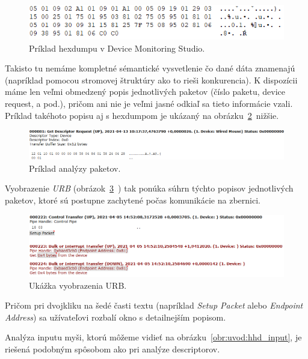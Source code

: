 \begin{figure}[!htb]
	\centering
	\includegraphics[width=12cm]{img/uvod_hhd_hexdump}
	\caption{Príklad hexdumpu v Device Monitoring Studio.}
	\label{obr:uvod:hhd_hexdump}
\end{figure}


Takisto tu nemáme kompletné sémantické vysvetlenie čo dané dáta znamenajú (napríklad pomocou stromovej štruktúry ako to rieši konkurencia). K dispozícii máme len veľmi obmedzený popis jednotlivých paketov (číslo paketu, device request, a pod.), pričom ani nie je veľmi jasné odkiaľ sa tieto informácie vzali. Príklad takéhoto popisu aj s hexdumpom je ukázaný na obrázku~\ref{obr:uvod:hhd_analyza}~nižšie.

\begin{figure}[!htb]
	\centering
	\includegraphics[width=\textwidth]{img/uvod_hhd_analyza}
	\caption{Príklad analýzy paketov.}
	\label{obr:uvod:hhd_analyza}
\end{figure}


Vyobrazenie \textit{URB} (obrázok~\ref{obr:uvod:hhd_urb}~) tak ponúka súhrn týchto popisov jednotlivých paketov, ktoré sú postupne zachytené počas komunikácie na zbernici.

\begin{figure}[!htb]
	\centering
	\includegraphics[width=\textwidth]{img/uvod_hhd_urb}
	\caption{Ukážka vyobrazenia URB.}
	\label{obr:uvod:hhd_urb}
\end{figure}

Pričom pri dvojkliku na šedé časti textu (napríklad \textit{Setup Packet} alebo \textit{Endpoint Address}) sa užívateľovi rozbalí okno s detailnejším popisom.
 
Analýza inputu myši, ktorú môžeme vidieť na obrázku~\ref{obr:uvod:hhd_input}, je riešená podobným spôsobom ako pri analýze descriptorov.

